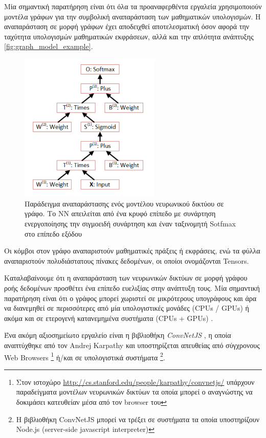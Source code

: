 Μία σημαντική παρατήρηση είναι ότι όλα τα προαναφερθέντα εργαλεία χρησιμοποιούν μοντέλα γράφων
για την συμβολική αναπαράσταση των μαθηματικών υπολογισμών. Η αναπαράσταση σε μορφή γράφων
έχει αποδειχθεί αποτελεσματική όσον αφορά την ταχύτητα υπολογισμών μαθηματικών εκφράσεων, αλλά και την
απλότητα ανάπτυξης \autoref{fig:graph_model_example}.

\begin{figure}[!ht]
  \centering
  \includegraphics[width=0.6\textwidth]{./images/chapter4/graph_model_example.png}
  \caption[Παράδειγμα αναπαράστασης ενός μοντέλου νευρωνικού δικτύου σε γράφο.
    Το ΝΝ αποτλείται από ένα κρυφό επίπεδο
    και ένα ταξινομητή Sotfmax στο επίπεδο εξόδου]{
    Παράδειγμα αναπαράστασης ενός μοντέλου νευρωνικού δικτύου σε γράφο.
    Το ΝΝ απειλείται από ένα κρυφό επίπεδο με συνάρτηση ενεργοποίησης την σιγμοειδή συνάρτηση
    και έναν ταξινομητή Sotfmax στο επίπεδο εξόδου}
  \label{fig:graph_model_example}
\end{figure}
Οι κόμβοι στον γράφο αναπαριστούν μαθηματικές πράξεις ή εκφράσεις, ενώ τα φύλλα
αναπαριστούν πολυδιάστατους πίνακες δεδομένων, οι οποίοι ονομάζονται Tensors.

Καταλαβαίνουμε ότι η αναπαράσταση των νευρωνικών δικτύων σε μορφή γράφου ροής
δεδομένων προσθέτει ένα επίπεδο ευελιξίας στην ανάπτυξη τους. Μία σημαντική παρατήρηση
είναι ότι ο γράφος μπορεί χωριστεί σε μικρότερους υπογράφους και άρα να διανεμηθεί
σε περισσότερες από μία υπολογιστικές μονάδες (CPUs / GPUs) ή ακόμα και
σε ετερογενή κατανεμημένα συστήματα (CPUs + GPUs) \cite{DBLP:journals/corr/AbadiABBCCCDDDG16} .

Ένα ακόμη αξιοσημείωτο εργαλείο είναι η βιβλιοθήκη \emph{ConvNetJS} \cite{karpathy2014convnetjs},
η οποία αναπτύχθηκε από τον Andrej Karpathy και υποστηρίζεται απευθείας από σύγχρονους
Web Browsers
\footnote{Στον ιστοχώρο \href{http://cs.stanford.edu/people/karpathy/convnetjs/}{http://cs.stanford.edu/people/karpathy/convnetjs/}
υπάρχουν παραδείγματα μοντέλων νευρωνικών δικτύων τα οποία μπορεί ο αναγνώστης να δοκιμάσει
κατευθείαν μέσα από τον browser του}
ή/και σε υπολογιστικά συστήματα
\footnote{Η βιβλιοθήκη ConvNetJS μπορεί να τρέξει σε συστήματα τα οποία
υποστηρίζουν Node.js (server-side javascript interpreter)}.

